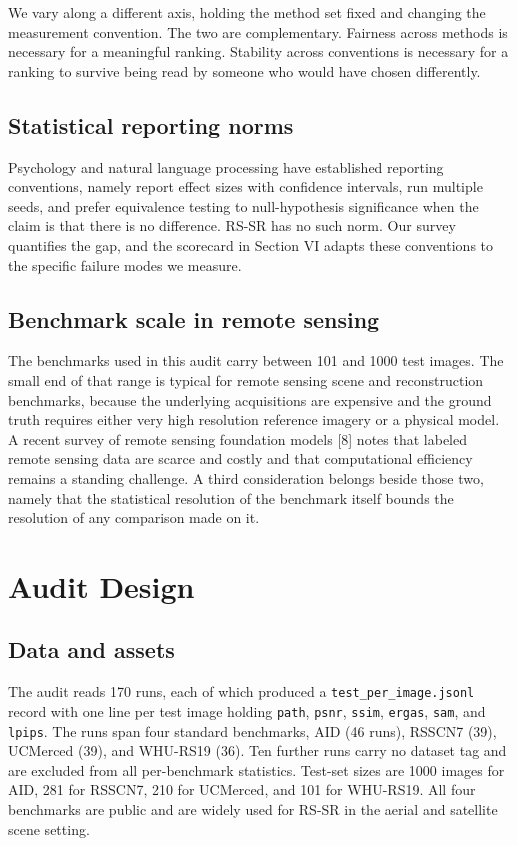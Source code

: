 \documentclass[journal,twoside,10pt]{IEEEtran}
\begin{document}
We vary along a different axis, holding the method set fixed and changing the measurement convention. The two are complementary. Fairness across methods is necessary for a meaningful ranking. Stability across conventions is necessary for a ranking to survive being read by someone who would have chosen differently.

\subsection{Statistical reporting norms}


Psychology and natural language processing have established reporting conventions, namely report effect sizes with confidence intervals, run multiple seeds, and prefer equivalence testing to null-hypothesis significance when the claim is that there is no difference. RS-SR has no such norm. Our survey quantifies the gap, and the scorecard in Section VI adapts these conventions to the specific failure modes we measure.

\subsection{Benchmark scale in remote sensing}


The benchmarks used in this audit carry between 101 and 1000 test images. The small end of that range is typical for remote sensing scene and reconstruction benchmarks, because the underlying acquisitions are expensive and the ground truth requires either very high resolution reference imagery or a physical model. A recent survey of remote sensing foundation models [8] notes that labeled remote sensing data are scarce and costly and that computational efficiency remains a standing challenge. A third consideration belongs beside those two, namely that the statistical resolution of the benchmark itself bounds the resolution of any comparison made on it.

\section{Audit Design}


\subsection{Data and assets}


The audit reads 170 runs, each of which produced a \texttt{test\_per\_image.jsonl} record with one line per test image holding \texttt{path}, \texttt{psnr}, \texttt{ssim}, \texttt{ergas}, \texttt{sam}, and \texttt{lpips}. The runs span four standard benchmarks, AID (46 runs), RSSCN7 (39), UCMerced (39), and WHU-RS19 (36). Ten further runs carry no dataset tag and are excluded from all per-benchmark statistics. Test-set sizes are 1000 images for AID, 281 for RSSCN7, 210 for UCMerced, and 101 for WHU-RS19. All four benchmarks are public and are widely used for RS-SR in the aerial and satellite scene setting.
\end{document}
